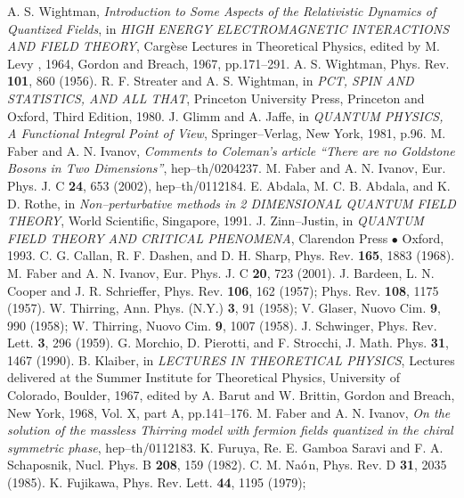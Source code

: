 \documentclass[a4paper,12pt] {article}
\begin{document}
\begin{thebibliography}{9}
\bibitem{[1]} 
A. S. Wightman, 
{\it Introduction to Some Aspects of the
Relativistic Dynamics of Quantized Fields}, in {\it HIGH ENERGY
ELECTROMAGNETIC INTERACTIONS AND FIELD THEORY}, Carg$\grave{\rm e}$se
Lectures in Theoretical Physics, edited by M. Levy , 1964, Gordon and
Breach, 1967, pp.171--291.
\bibitem{[2]}
A. S. Wightman,
Phys. Rev. {\bf 101}, 860 (1956).
\bibitem{[3]} 
R. F. Streater and A. S. Wightman,
in {\it PCT, SPIN AND STATISTICS, AND ALL THAT},
Princeton University Press, Princeton and Oxford, Third Edition, 
1980.
\bibitem{[4]} 
J. Glimm and A. Jaffe, 
in {\it QUANTUM PHYSICS, A
Functional Integral Point of View}, 
Springer--Verlag, New York, 1981, p.96.
\bibitem{[5]}
M. Faber and A. N. Ivanov,
{\it Comments to Coleman's article ``There are no Goldstone Bosons 
in Two Dimensions''}, hep--th/0204237.
\bibitem{[6]}
M. Faber and A. N. Ivanov,
Eur. Phys. J. C {\bf 24}, 653 (2002), hep--th/0112184.
\bibitem{[7]}
E. Abdala, M. C. B. Abdala, and K. D. Rothe,
in {\it Non--perturbative methods in 2 DIMENSIONAL 
QUANTUM FIELD THEORY}, World Scientific, Singapore, 1991.
\bibitem{[8]}
J. Zinn--Justin,
in {\it QUANTUM FIELD THEORY AND CRITICAL PHENOMENA},
Clarendon Press$\,\bullet\,$Oxford, 1993.
\bibitem{[9]}
C. G. Callan, R. F. Dashen, and D. H. Sharp,
Phys. Rev. {\bf 165}, 1883 (1968).
\bibitem{[10]}
M. Faber and A. N. Ivanov,
Eur. Phys. J. C {\bf 20}, 723 (2001).
\bibitem{[11]} 
J. Bardeen, L. N. Cooper and J. R. Schrieffer,
Phys. Rev. {\bf 106}, 162 (1957); Phys. Rev. {\bf 108}, 1175 (1957).
\bibitem{[12]}
W. Thirring, 
Ann. Phys. (N.Y.) {\bf 3}, 91 (1958);
V. Glaser,
Nuovo Cim. {\bf 9}, 990 (1958);
W. Thirring,
Nuovo Cim. {\bf 9}, 1007 (1958).
\bibitem{[13]}
J. Schwinger,
Phys. Rev. Lett. {\bf 3}, 296 (1959).
\bibitem{[14]}
G. Morchio, D. Pierotti, and F. Strocchi,
J. Math. Phys. {\bf 31}, 1467 (1990).
\bibitem{[15]}
B. Klaiber, 
in {\it LECTURES IN THEORETICAL PHYSICS},
Lectures delivered at the Summer Institute for Theoretical Physics,
University of Colorado, Boulder, 1967, edited by A. Barut and
W. Brittin, Gordon and Breach, New York, 1968, Vol. X, 
part A, pp.141--176.
\bibitem{[16]}
M. Faber and A. N. Ivanov,
{\it On the solution of the massless
Thirring model  with fermion
fields quantized in the chiral symmetric phase},  hep--th/0112183.
\bibitem{[17]}
K. Furuya, Re. E. Gamboa Saravi and F. A. Schaposnik,
Nucl. Phys. B {\bf 208}, 159 (1982).
\bibitem{[18]}
C. M. Na${\acute{\rm o}}$n,
Phys. Rev. D {\bf 31}, 2035 (1985).
\bibitem{[19]} 
K. Fujikawa, Phys. Rev. Lett. {\bf 44}, 1195 (1979);

\end{thebibliography}
\end{document}
